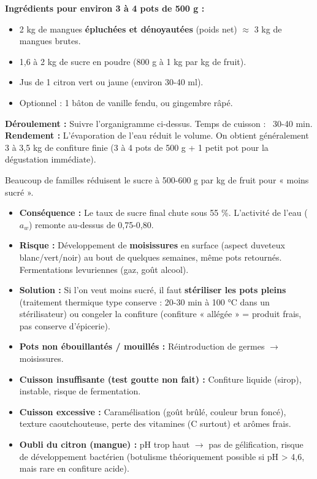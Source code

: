 \documentclass[11pt]{article}
\begin{document}
\begin{exemplebox}
\textbf{Ingrédients pour environ 3 à 4 pots de 500 g :}
\begin{itemize}
    \item 2 kg de mangues \textbf{épluchées et dénoyautées} (poids net) $\approx$ 3 kg de mangues brutes.
    \item 1,6 à 2 kg de sucre en poudre (800 g à 1 kg par kg de fruit).
    \item Jus de 1 citron vert ou jaune (environ 30-40 ml).
    \item Optionnel : 1 bâton de vanille fendu, ou gingembre râpé.
\end{itemize}
\textbf{Déroulement :} Suivre l'organigramme ci-dessus. Temps de cuisson : ~30-40 min.
\textbf{Rendement :} L'évaporation de l'eau réduit le volume. On obtient généralement 3 à 3,5 kg de confiture finie (3 à 4 pots de 500 g + 1 petit pot pour la dégustation immédiate).
\end{exemplebox}

\begin{attention}
Beaucoup de familles réduisent le sucre à 500-600 g par kg de fruit pour « moins sucré ».
\begin{itemize}
    \item \textbf{Conséquence :} Le taux de sucre final chute sous 55 \%. L'activité de l'eau ($a_w$) remonte au-dessus de 0,75-0,80.
    \item \textbf{Risque :} Développement de \textbf{moisissures} en surface (aspect duveteux blanc/vert/noir) au bout de quelques semaines, même pots retournés. Fermentations levuriennes (gaz, goût alcool).
    \item \textbf{Solution :} Si l'on veut moins sucré, il faut \textbf{stériliser les pots pleins} (traitement thermique type conserve : 20-30 min à 100 °C dans un stérilisateur) ou congeler la confiture (confiture « allégée » = produit frais, pas conserve d'épicerie).
\end{itemize}
\end{attention}

\begin{attention}
\begin{itemize}
    \item \textbf{Pots non ébouillantés / mouillés :} Réintroduction de germes $\rightarrow$ moisissures.
    \item \textbf{Cuisson insuffisante (test goutte non fait) :} Confiture liquide (sirop), instable, risque de fermentation.
    \item \textbf{Cuisson excessive :} Caramélisation (goût brûlé, couleur brun foncé), texture caoutchouteuse, perte des vitamines (C surtout) et arômes frais.
    \item \textbf{Oubli du citron (mangue) :} pH trop haut $\rightarrow$ pas de gélification, risque de développement bactérien (botulisme théoriquement possible si pH > 4,6, mais rare en confiture acide).
\end{itemize}
\end{attention}
\end{document}
